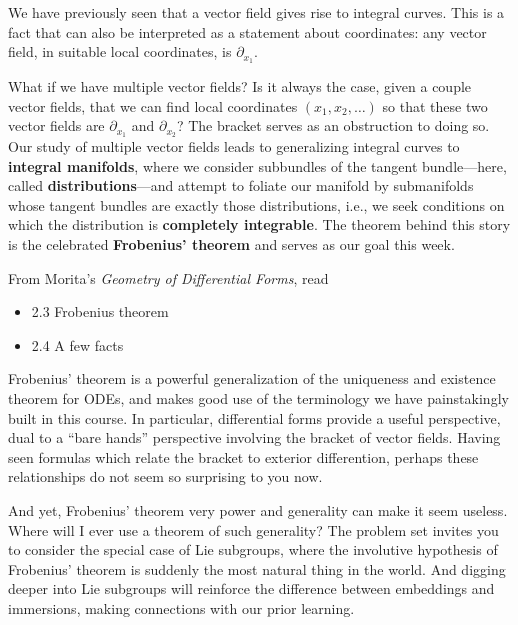 \documentclass{homework}
\author{Jim Fowler}
\date{Week 6: Frobenius' theorem}
\begin{document}
\maketitle

We have previously seen that a vector field gives rise to integral
curves.  This is a fact that can also be interpreted as a statement
about coordinates: any vector field, in suitable local coordinates, is
$\partial_{x_1}$.

What if we have multiple vector fields?  Is it always the case, given
a couple vector fields, that we can find local coordinates
$(x_1,x_2,\ldots)$ so that these two vector fields are
$\partial_{x_1}$ and $\partial_{x_2}$?  The bracket serves as an
obstruction to doing so.  Our study of multiple vector fields leads to
generalizing integral curves to \textbf{integral manifolds}, where we
consider subbundles of the tangent bundle---here, called
\textbf{distributions}---and attempt to foliate our manifold by
submanifolds whose tangent bundles are exactly those distributions,
i.e., we seek conditions on which the distribution is
\textbf{completely integrable}.  The theorem behind this story is the
celebrated \textbf{Frobenius' theorem} and serves as our goal this
week.

From Morita's \textit{Geometry of Differential Forms}, read
\begin{itemize}
\item 2.3 Frobenius theorem
\item 2.4 A few facts
\end{itemize} Frobenius' theorem is a powerful generalization of the
uniqueness and existence theorem for ODEs, and makes good use of the
terminology we have painstakingly built in this course.  In
particular, differential forms provide a useful perspective, dual to a
``bare hands'' perspective involving the bracket of vector fields.
Having seen formulas which relate the bracket to exterior
differention, perhaps these relationships do not seem so surprising to
you now.

And yet, Frobenius' theorem very power and generality can make it seem
useless.  Where will I ever use a theorem of such generality?  The
problem set invites you to consider the special case of Lie subgroups,
where the involutive hypothesis of Frobenius' theorem is suddenly the
most natural thing in the world.  And digging deeper into Lie
subgroups will reinforce the difference between embeddings and
immersions, making connections with our prior learning.
\end{document}
